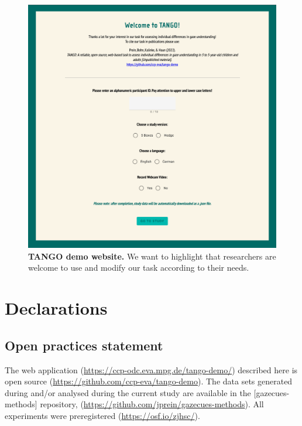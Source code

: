 \documentclass[
  man,floatsintext]{apa6}
\begin{document}
\begin{figure}

{\centering \includegraphics[width=1\linewidth]{../figures/tango_demo_screenshot} 

}

\caption{\textbf{TANGO demo website.} We want to highlight that researchers are welcome to use and modify our task according to their needs.}\label{fig:fig4}
\end{figure}

\newpage

\hypertarget{declarations}{%
\section{Declarations}\label{declarations}}

\hypertarget{open-practices-statement}{%
\subsection{Open practices statement}\label{open-practices-statement}}

The web application (\url{https://ccp-odc.eva.mpg.de/tango-demo/}) described here is open source (\url{https://github.com/ccp-eva/tango-demo}).
The data sets generated during and/or analysed during the current study are available in the {[}gazecues-methods{]} repository, (\url{https://github.com/jprein/gazecues-methods}).
All experiments were preregistered (\url{https://osf.io/zjhsc/}).
\end{document}
